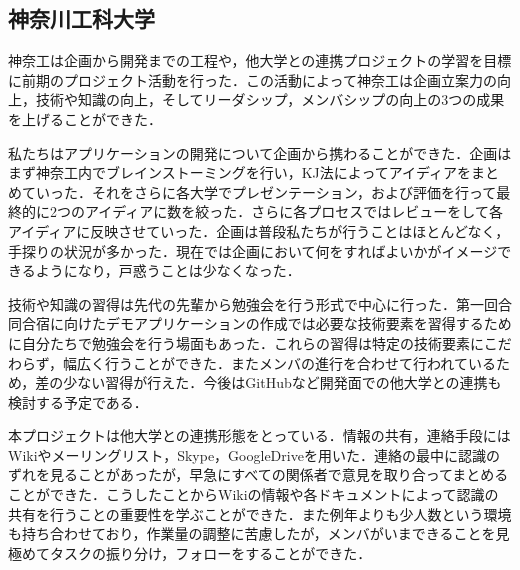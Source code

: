 \subsection{神奈川工科大学}
\par 神奈工は企画から開発までの工程や，他大学との連携プロジェクトの学習を目標に前期のプロジェクト活動を行った．この活動によって神奈工は企画立案力の向上，技術や知識の向上，そしてリーダシップ，メンバシップの向上の3つの成果を上げることができた．
\par 私たちはアプリケーションの開発について企画から携わることができた．企画はまず神奈工内でブレインストーミングを行い，KJ法によってアイディアをまとめていった．それをさらに各大学でプレゼンテーション，および評価を行って最終的に2つのアイディアに数を絞った．さらに各プロセスではレビューをして各アイディアに反映させていった．企画は普段私たちが行うことはほとんどなく，手探りの状況が多かった．現在では企画において何をすればよいかがイメージできるようになり，戸惑うことは少なくなった．
\par 技術や知識の習得は先代の先輩から勉強会を行う形式で中心に行った．第一回合同合宿に向けたデモアプリケーションの作成では必要な技術要素を習得するために自分たちで勉強会を行う場面もあった．これらの習得は特定の技術要素にこだわらず，幅広く行うことができた．またメンバの進行を合わせて行われているため，差の少ない習得が行えた．今後はGitHubなど開発面での他大学との連携も検討する予定である．
\par 本プロジェクトは他大学との連携形態をとっている．情報の共有，連絡手段にはWikiやメーリングリスト，Skype，GoogleDriveを用いた．連絡の最中に認識のずれを見ることがあったが，早急にすべての関係者で意見を取り合ってまとめることができた．こうしたことからWikiの情報や各ドキュメントによって認識の共有を行うことの重要性を学ぶことができた．また例年よりも少人数という環境も持ち合わせており，作業量の調整に苦慮したが，メンバがいまできることを見極めてタスクの振り分け，フォローをすることができた．
